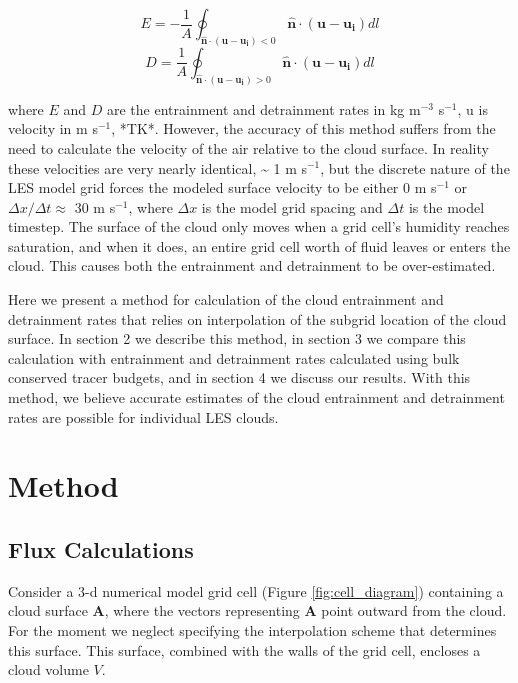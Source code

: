 \documentclass[12pt]{article}
\begin{document}
\begin{equation}
E = -\frac{1}{A}\oint_{\mathbf{\hat{n}}\cdot(\mathbf{u} - \mathbf{u_i}) < 0}
\mathbf{\hat{n}}\cdot(\mathbf{u}-\mathbf{u_i})dl
\end{equation}
\begin{equation}
D = \frac{1}{A}\oint_{\mathbf{\hat{n}}\cdot(\mathbf{u} - \mathbf{u_i}) > 0}
\mathbf{\hat{n}}\cdot(\mathbf{u}-\mathbf{u_i})dl
\end{equation}

where $E$ and $D$ are the entrainment and detrainment rates in kg 
m$^{-3}$ s$^{-1}$, u is velocity in m s$^{-1}$, *TK*.  However, the
accuracy of this method suffers from the need to calculate the velocity 
of the air relative to the cloud surface.  In reality 
these velocities are very nearly identical, \textasciitilde{} 1 m 
s$^{-1}$, but the discrete nature of the LES model grid forces the 
modeled surface velocity to be either 0 m s$^{-1}$ or $\Delta x / \Delta t 
\approx$ 30 m s$^{-1}$, where $\Delta x$ is the model grid spacing and 
$\Delta t$ is the model timestep.  The surface of the cloud only moves 
when a grid cell's humidity reaches saturation, and when it 
does, an entire grid cell worth of fluid leaves or enters the cloud.  This 
causes both the entrainment and detrainment to be over-estimated.

Here we present a method for calculation of the cloud entrainment and 
detrainment rates that relies on interpolation of the subgrid location 
of the cloud surface.  In section 2 we describe this method, in section 
3 we compare this calculation with entrainment and detrainment rates 
calculated using bulk conserved tracer budgets, and in section 4 we 
discuss our results.  With this method, we believe accurate estimates 
of the cloud entrainment and detrainment rates are possible for 
individual LES clouds.


\section{Method}

\subsection{Flux Calculations}

Consider a 3-d numerical model grid cell (Figure \ref{fig:cell_diagram}) containing a 
cloud surface $\mathbf{A}$, where the vectors representing $\mathbf{A}$ point 
outward from the cloud.  For the moment we neglect specifying the interpolation 
scheme that determines this surface.  This surface, combined with the walls of 
the grid cell, encloses a cloud volume $V$.
\end{document}
